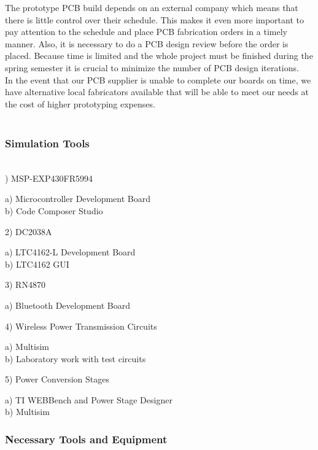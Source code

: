 \documentclass[12pt]{article}
\begin{document}
\indent
The prototype PCB build depends on an external company which means that there is little control over their schedule. This makes it even more important to pay attention to the schedule and place PCB fabrication orders in a timely manner. Also, it is necessary to do a PCB design review before the order is placed. Because time is limited and the whole project must be finished during the spring semester it is crucial to minimize the number of PCB design iterations.\\

\indent
In the event that our PCB supplier is unable to complete our boards on time, we have alternative local fabricators available that will be able to meet our needs at the cost of higher prototyping expenses. \\

\pagebreak
\hfill \\

\subsubsection{Simulation Tools}
\hfill \\

) MSP-EXP430FR5994
\begin{addmargin}[0.50cm]{0.75cm}
a) Microcontroller Development Board\\
b) Code Composer Studio
\end{addmargin}
2) DC2038A
\begin{addmargin}[0.50cm]{0.75cm}
a) LTC4162-L Development Board\\
b) LTC4162 GUI
\end{addmargin}
3) RN4870
\begin{addmargin}[0.50cm]{0.75cm}
a) Bluetooth Development Board
\end{addmargin}
4) Wireless Power Transmission Circuits
\begin{addmargin}[0.50cm]{0.75cm}
a) Multisim\\
b) Laboratory work with test circuits
\end{addmargin}
5) Power Conversion Stages
\begin{addmargin}[0.50cm]{0.75cm}
a) TI WEBBench and Power Stage Designer\\
b) Multisim
\end{addmargin}

\subsubsection{Necessary Tools and Equipment}
\hfill \\
\end{document}
